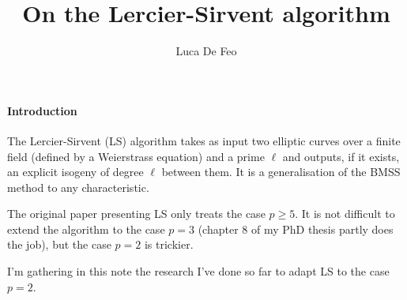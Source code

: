 \documentclass{article}
\title{On the Lercier-Sirvent algorithm}
\author{Luca De Feo}
\begin{document}
\maketitle

\paragraph{Introduction}
The Lercier-Sirvent (LS) algorithm \cite{lercier+sirvent08} takes as
input two elliptic curves over a finite field (defined by a
Weierstrass equation) and a prime $\ell$ and outputs, if it exists, an
explicit isogeny of degree $\ell$ between them. It is a generalisation
of the BMSS method \cite{bostan+morain+salvy+schost08} to any
characteristic.

The original paper presenting LS only treats the case $p\ge5$. It is
not difficult to extend the algorithm to the case $p=3$ (chapter 8 of
my PhD thesis \cite{df+thesis} partly does the job), but the case
$p=2$ is trickier.

I'm gathering in this note the research I've done so far to adapt LS
to the case $p=2$.
\end{document}
